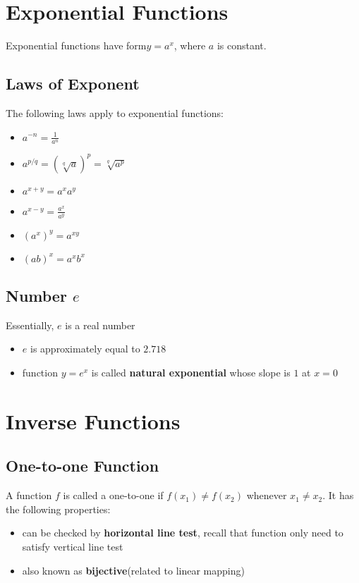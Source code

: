 \documentclass[10pt,a4paper,oneside]{article}
\begin{document}
\section{Exponential Functions}
Exponential functions have form$y = a^x$, where $a$ is constant.

\subsection{Laws of Exponent}
The following laws apply to exponential functions:
\begin{itemize}
	\item $a^{-n} = \frac{1}{a^n}$
	\item $a^{p/q} = (\sqrt[q]{a})^p = \sqrt[q]{a^p}$
	\item $a^{x+y} = a^x a^y$
	\item $a^{x-y} = \frac{a^x}{a^y}$
	\item $(a^x)^y = a^{xy}$
	\item $(ab)^x = a^x b^x$  
\end{itemize}

\subsection{Number $e$}
Essentially, $e$ is a real number
\begin{itemize}
	\item $e$ is approximately equal to $2.718$
	\item function $y = e^x$ is called \textbf{natural exponential} whose slope is $1$ at $x=0$
\end{itemize}

\section{Inverse Functions}
\subsection{One-to-one Function}
A function $f$ is called a one-to-one if $f(x_1) \neq f(x_2)$ whenever $x_1 \neq x_2$. It has the following properties:
\begin{itemize}
	\item can be checked by \textbf{horizontal line test}, recall that function only need to satisfy vertical line test
	\item also known as \textbf{bijective}(related to linear mapping)
\end{itemize}
\end{document}

